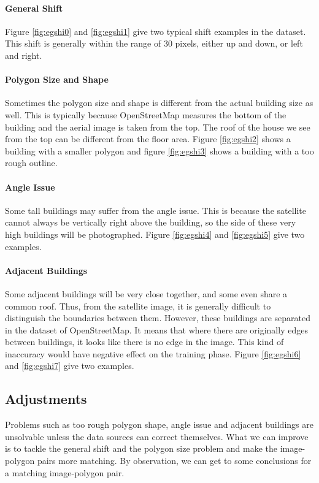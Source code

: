 

\paragraph{General Shift}
Figure \ref{fig:egshi0} and \ref{fig:egshi1} give two typical shift examples in the dataset. This shift is generally within the range of 30 pixels, either up and down, or left and right.

\paragraph{Polygon Size and Shape}
Sometimes the polygon size and shape is different from the actual building size as well. This is typically because OpenStreetMap measures the bottom of the building and the aerial image is taken from the top. The roof of the house we see from the top can be different from the floor area. Figure \ref{fig:egshi2} shows a building with a smaller polygon and figure \ref{fig:egshi3} shows a building with a too rough outline.

\paragraph{Angle Issue}
Some tall buildings may suffer from the angle issue. This is because the satellite cannot always be vertically right above the building, so the side of these very high buildings will be photographed. Figure \ref{fig:egshi4} and \ref{fig:egshi5} give two examples.

\paragraph{Adjacent Buildings}
Some adjacent buildings will be very close together, and some even share a common roof. Thus, from the satellite image, it is generally difficult to distinguish the boundaries between them. However, these buildings are separated in the dataset of OpenStreetMap. It means that where there are originally edges between buildings, it looks like there is no edge in the image. This kind of inaccuracy would have  negative effect on the training phase. Figure \ref{fig:egshi6} and \ref{fig:egshi7} give two examples.

\subsection{Adjustments}\label{adjust}
Problems such as too rough polygon shape, angle issue and adjacent buildings are unsolvable unless the data sources can correct themselves. What we can improve is to tackle the general shift and the polygon size problem and make the image-polygon pairs more matching. By observation, we can get to some conclusions for a matching image-polygon pair.

